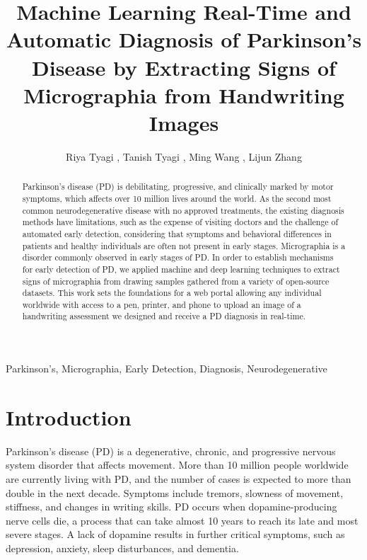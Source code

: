 \documentclass[pmlr,twocolumn,10pt]{jmlr} %
\title[Machine Learning for Diagnosis of Parkinson's Disease]{Machine Learning Real-Time and Automatic Diagnosis of Parkinson’s Disease by Extracting Signs of Micrographia from Handwriting Images}
\author{Riya Tyagi \nametag{\thanks{Authors contributed equally}\SUP{1}},
Tanish Tyagi \nametag{\footnotemark[1]\SUP{2}}, 
Ming Wang \SUP{3},
Lijun Zhang \SUP{4}
\centering \Email{
\\[\bigskipamount] 
\SUP{1}\{rtyagi\}
@exeter.edu}
\centering \Email{
\\[\bigskipamount] 
\SUP{2}\{ttyagi\}@mgh.harvard.edu}
\centering \Email{
\\[\bigskipamount] 
\SUP{3}\{mwang\}@phs.psu.edu}
\centering \Email{
\\[\bigskipamount] 
\SUP{4}\{lzhang6\}@pennstatehealth.psu.edu}
}
\begin{document}
\maketitle

\begin{abstract}
Parkinson’s disease (PD) is debilitating, progressive, and clinically marked by motor symptoms, which affects over 10 million lives around the world. As the second most common neurodegenerative disease with no approved treatments, the existing diagnosis methods have limitations, such as the expense of visiting doctors and the challenge of automated early detection, considering that symptoms and behavioral differences in patients and healthy individuals are often not present in early stages. Micrographia is a disorder commonly observed in early stages of PD. In order to establish mechanisms for early detection of PD, we applied machine and deep learning techniques to extract signs of micrographia from drawing samples gathered from a variety of open-source datasets.  This work sets the foundations for a web portal allowing any individual worldwide with access to a pen, printer, and phone to upload an image of a handwriting assessment we designed and receive a PD diagnosis in real-time.
\end{abstract}

\begin{keywords}
Parkinson’s, Micrographia, Early Detection, Diagnosis, Neurodegenerative
\end{keywords}

\section{Introduction}
\label{sec:intro}

Parkinson’s disease (PD) is a degenerative, chronic, and progressive nervous system disorder that affects movement. More than 10 million people worldwide are currently living with PD, and the number of cases is expected to more than double in the next decade. Symptoms include tremors, slowness of movement, stiffness, and changes in writing skills. PD occurs when dopamine-producing nerve cells die, a process that can take almost 10 years to reach its late and most severe stages. A lack of dopamine results in further critical symptoms, such as depression, anxiety, sleep disturbances, and dementia. 
\end{document}
